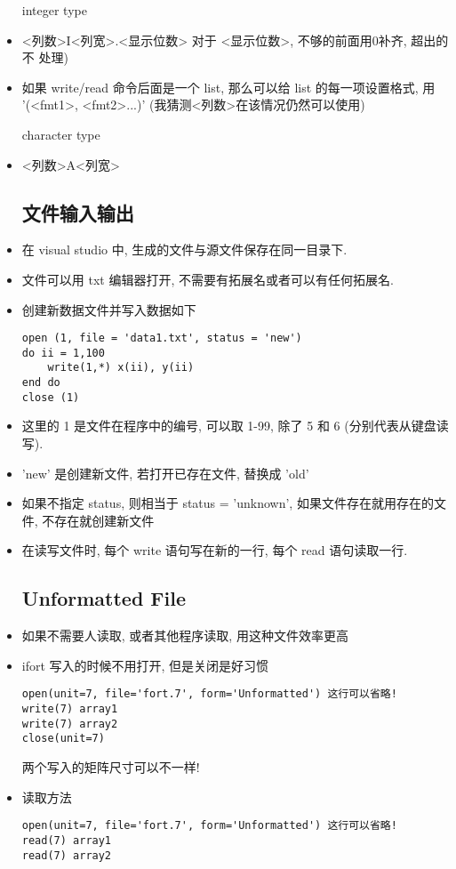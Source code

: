 \begin{itemize}
integer type
\item <列数>I<列宽>.<显示位数>  对于 <显示位数>, 不够的前面用0补齐, 超出的不
   处理)
\item 如果 write/read 命令后面是一个 list, 那么可以给 list 的每一项设置格式, 用 '(<fmt1>, <fmt2>...)'  (我猜测<列数>在该情况仍然可以使用)

character type
\item <列数>A<列宽>

\subsection{文件输入输出}
\item 在 visual studio 中, 生成的文件与源文件保存在同一目录下.
\item 文件可以用 txt 编辑器打开, 不需要有拓展名或者可以有任何拓展名.
\item 创建新数据文件并写入数据如下
\begin{lstlisting}
open (1, file = 'data1.txt', status = 'new')
do ii = 1,100
	write(1,*) x(ii), y(ii)
end do
close (1)
\end{lstlisting}
\item 这里的 1 是文件在程序中的编号, 可以取 1-99, 除了 5 和 6 (分别代表从键盘读写).
\item 'new' 是创建新文件, 若打开已存在文件, 替换成 'old'
\item 如果不指定 status, 则相当于 status = 'unknown', 如果文件存在就用存在的文件, 不存在就创建新文件
\item 在读写文件时, 每个 write 语句写在新的一行, 每个 read 语句读取一行.

\subsection{Unformatted File}
\item 如果不需要人读取, 或者其他程序读取, 用这种文件效率更高
\item ifort 写入的时候不用打开, 但是关闭是好习惯
\begin{lstlisting}
open(unit=7, file='fort.7', form='Unformatted') 这行可以省略!
write(7) array1
write(7) array2
close(unit=7)
\end{lstlisting}
两个写入的矩阵尺寸可以不一样!

\item 读取方法
\begin{lstlisting}
open(unit=7, file='fort.7', form='Unformatted') 这行可以省略!
read(7) array1
read(7) array2
\end{lstlisting}
\end{itemize}

